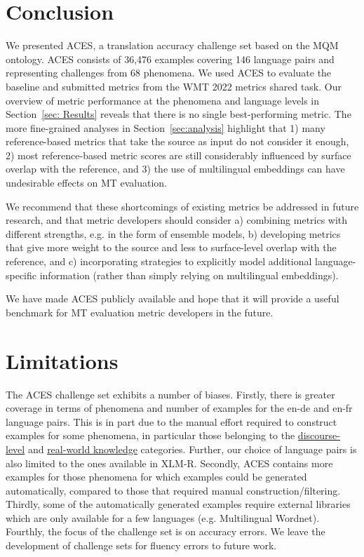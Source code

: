 \documentclass[11pt]{article}
\begin{document}
\section{Conclusion}
We presented \textsc{ACES}, a translation accuracy challenge set based on the MQM ontology. \textsc{ACES} consists of 36,476 examples covering 146 language pairs and representing challenges
from 68 phenomena. We used \textsc{ACES} to evaluate the baseline and submitted metrics from the WMT 2022 metrics shared task. Our overview of metric performance at the phenomena and language levels in Section~\ref{sec: Results} reveals that there is no single best-performing metric. The more fine-grained analyses in Section~\ref{sec:analysis} highlight that 1) many reference-based metrics that take the source as input do not consider it enough, 2) most
reference-based metric scores are still considerably
influenced by surface overlap with the reference, and 3) the use of multilingual embeddings can have undesirable effects on MT evaluation.

We recommend that these shortcomings of existing metrics
be addressed in future research, and that metric developers should consider a) combining metrics with different strengths, e.g. in the form of ensemble models, b) developing metrics that give more weight to the source and less to surface-level overlap with the reference, and c) incorporating strategies to explicitly model additional language-specific information (rather than simply relying on multilingual embeddings). 

We have made \textsc{ACES} publicly available and hope that it will provide a useful benchmark for MT evaluation metric developers in the future.


\section*{Limitations}
The \textsc{ACES} challenge set exhibits a number of biases. Firstly, there is greater coverage in terms of phenomena and number of examples for the en-de and en-fr language pairs. This is in part due to the manual effort required to construct examples for some phenomena, in particular those belonging to the \hyperref[sec:discourse]{discourse-level} and \hyperref[sec:real-world-knowledge]{real-world knowledge} categories. Further, our choice of language pairs is also limited to the ones available in XLM-R. Secondly, \textsc{ACES} contains more examples for those phenomena for which examples could be generated automatically, compared to those that required manual construction/filtering. Thirdly, some of the automatically generated examples require external libraries which are only available for a few languages (e.g. Multilingual Wordnet). Fourthly, the focus of the challenge set is on accuracy errors. We leave the development of challenge sets for fluency errors to future work.
\end{document}
